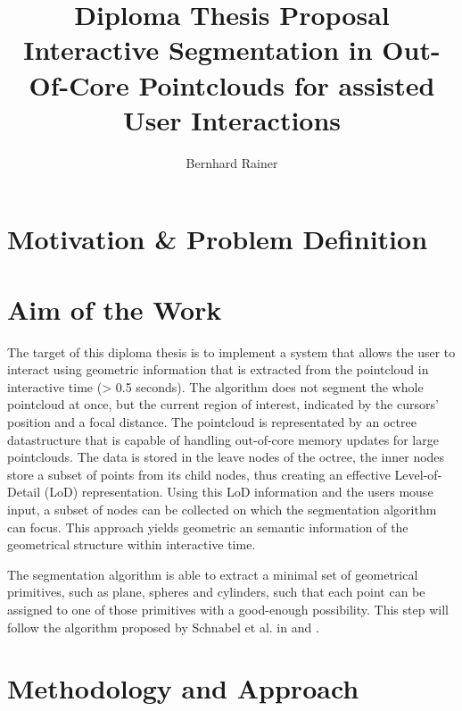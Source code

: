 \documentclass[]{article}
\title{\textbf{Diploma Thesis Proposal}\\
	\Large Interactive Segmentation in Out-Of-Core Pointclouds for assisted User Interactions}
\author{Bernhard Rainer}
\begin{document}
\maketitle

\section{Motivation \& Problem Definition}

\section{Aim of the Work}

The target of this diploma thesis is to implement a system that allows the user to interact using geometric information that is extracted from the pointcloud in interactive time (> 0.5 seconds). The algorithm does not segment the whole pointcloud at once, but the current region of interest, indicated by the cursors' position and a focal distance. The pointcloud is representated by an octree datastructure that is capable of handling out-of-core memory updates for large pointclouds. The data is stored in the leave nodes of the octree, the inner nodes store a subset of points from its child nodes, thus creating an effective Level-of-Detail (LoD) representation. Using this LoD information and the users mouse input, a subset of nodes can be collected on which the segmentation algorithm can focus. This approach yields geometric an semantic information of the geometrical structure within interactive time. 

The segmentation algorithm is able to extract a minimal set of geometrical primitives, such as plane, spheres and cylinders, such that each point can be assigned to one of those primitives with a good-enough possibility. This step will follow the algorithm proposed by Schnabel et al. in \cite{schnabel-2007-efficient} and \cite{schnabel-2007-ransac}. 




\section{Methodology and Approach}
\end{document}
